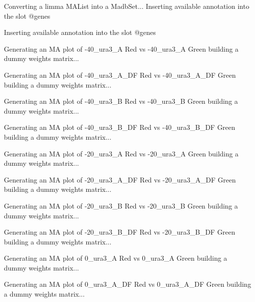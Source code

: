 \documentclass[titlepage]{article}
\begin{document}
\begin{Schunk}
\begin{Soutput}
Converting a limma MAList into a MadbSet...
Inserting available annotation into the slot @genes

Inserting available annotation into the slot @genes

Generating an MA plot of  -40_ura3_A Red vs -40_ura3_A Green 
building a dummy weights matrix... 

Generating an MA plot of  -40_ura3_A_DF Red vs -40_ura3_A_DF Green 
building a dummy weights matrix... 

Generating an MA plot of  -40_ura3_B Red vs -40_ura3_B Green 
building a dummy weights matrix... 

Generating an MA plot of  -40_ura3_B_DF Red vs -40_ura3_B_DF Green 
building a dummy weights matrix... 

Generating an MA plot of  -20_ura3_A Red vs -20_ura3_A Green 
building a dummy weights matrix... 

Generating an MA plot of  -20_ura3_A_DF Red vs -20_ura3_A_DF Green 
building a dummy weights matrix... 

Generating an MA plot of  -20_ura3_B Red vs -20_ura3_B Green 
building a dummy weights matrix... 

Generating an MA plot of  -20_ura3_B_DF Red vs -20_ura3_B_DF Green 
building a dummy weights matrix... 

Generating an MA plot of  0_ura3_A Red vs 0_ura3_A Green 
building a dummy weights matrix... 

Generating an MA plot of  0_ura3_A_DF Red vs 0_ura3_A_DF Green 
building a dummy weights matrix... 


\end{Soutput}
\end{Schunk}
\end{document}
